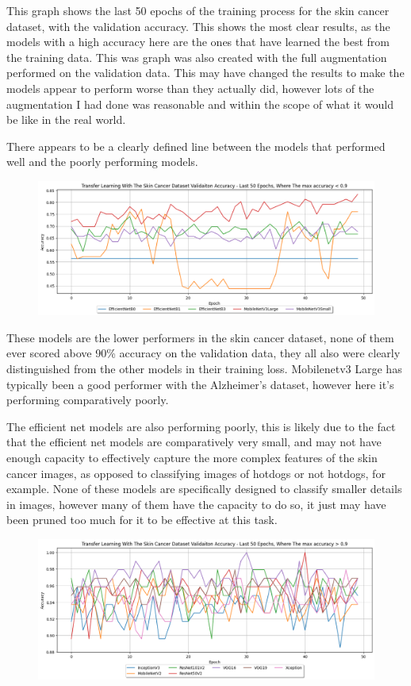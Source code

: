 \documentclass[]{final_report}
\begin{document}
This graph shows the last 50 epochs of the training process for the skin cancer dataset, with the validation accuracy. This shows the most clear results, as the models with a high accuracy here are the ones that have learned the best from the training data.
This was graph was also created with the full augmentation performed on the validation data. This may have changed the results to make the models appear to perform worse than they actually did, however lots of the augmentation I had done was reasonable and within the scope of what it would be like in the real world.

There appears to be a clearly defined line between the models that performed well and the poorly performing models.

\begin{figure}[ht!]
  \centering
  \includegraphics[width=1\textwidth]{images/Skin-cancer-validation-accuracy-last-50-low-performers.png}
\end{figure}

These models are the lower performers in the skin cancer dataset, none of them ever scored above 90\% accuracy on the validation data, they all also were clearly distinguished from the other models in their training loss. Mobilenetv3 Large has typically been a good performer with the Alzheimer's dataset, however here it's performing comparatively poorly.

The efficient net models are also performing poorly, this is likely due to the fact that the efficient net models are comparatively very small, and may not have enough capacity to effectively capture the more complex features of the skin cancer images, as opposed to classifying images of hotdogs or not hotdogs, for example. None of these models are specifically designed to classify smaller details in images, however many of them have the capacity to do so, it just may have been pruned too much for it to be effective at this task.

\begin{figure}[ht!]
  \centering
  \includegraphics[width=1\textwidth]{images/Skin-cancer-validation-accuracy-last-50-high-performers.png}
\end{figure}
\end{document}
